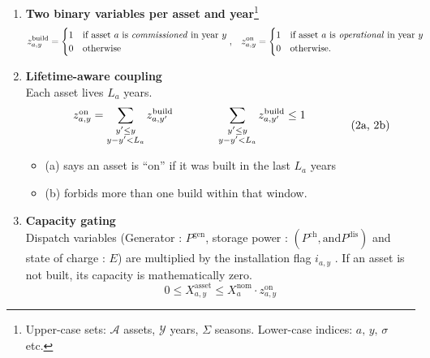 \begin{enumerate}[label=\textbf{\roman*}.]
  \item \textbf{Two binary variables per asset and year}\footnote{Upper-case sets:
        $\mathcal{A}$ assets, $\mathcal{Y}$ years, $\Sigma$ seasons.
        Lower-case indices: $a,\,y,\,\sigma$ etc.}
        \begin{align*}
            z^{\text{build}}_{a,y} &= 
              \begin{cases}
                1 &\text{if asset $a$ is \emph{commissioned} in year $y$}\\
                0 &\text{otherwise}
              \end{cases},
            &
            z^{\text{on}}_{a,y} &= 
              \begin{cases}
                1 &\text{if asset $a$ is \emph{operational} in year $y$}\\
                0 &\text{otherwise.}
              \end{cases}
        \end{align*}

  \item \textbf{Lifetime-aware coupling}\\
        Each asset lives $L_a$ years.
        \begin{equation}
            \setlength{\arraycolsep}{2em}
            \begin{array}{rlrl}
                z^{\text{on}}_{a,y} = \displaystyle \sum_{\substack{y' \le y \\ y - y' < L_a}} z^{\text{build}}_{a,y'} 
                & \displaystyle \sum_{\substack{y' \le y \\ y - y' < L_a}} z^{\text{build}}_{a,y'} \le 1
            \end{array}
            \tag{2a, 2b}
            \label{eq:lifetime_link}
        \end{equation}
        \addtocounter{equation}{1}  %
        \noindent
        \begin{itemize}
            \item (a) says an asset is “on” if it was built in the last $L_a$ years
            \item (b) forbids more than one build within that window.
        \end{itemize}

  \item \textbf{Capacity gating}\\
       Dispatch variables (Generator : $P^{\mathrm{gen}}$, storage power : $(P^{\mathrm{ch}},
       \text{and} P^{\mathrm{dis}})$ and state of charge : $E$) are multiplied by the installation flag $i_{a,y}$ .
       If an asset is not built, its capacity is mathematically zero.
       \[ 0 \leq X^{\text{asset}}_{a,y} \leq X^{\text{nom}}_{a} \cdot z^{\text{on}}_{a,y} \]



\end{enumerate}
